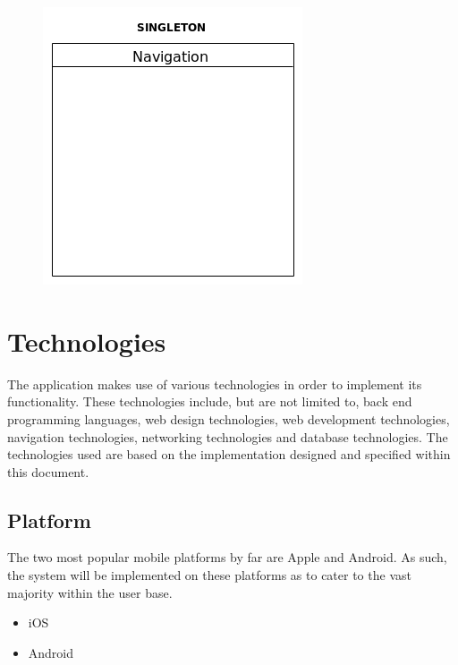 \documentclass{article}
\begin{document}
	\begin{figure}[h]
  		\includegraphics[width=\textwidth]{Images/Singleton.png}
	\end{figure}
	\FloatBarrier	

\section{Technologies}
The application makes use of various technologies in order to implement its functionality. These technologies include, but are not limited to, back end programming languages, web design technologies, web development technologies, navigation technologies, networking technologies and database technologies.  The technologies used are based on the implementation designed and specified within this document.  
	\subsection{Platform}
The two most popular mobile platforms by far are Apple and Android.  As such, the system will be implemented on these platforms as to cater to the vast majority within the user base. 
		\begin{itemize}
			\item iOS
			\item Android
		\end{itemize}
\end{document}
